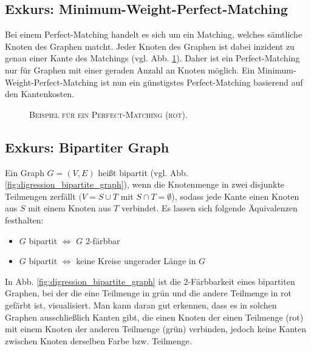 \subsection{Exkurs: Minimum-Weight-Perfect-Matching}
\label{sec:digression_mwpm}

Bei einem Perfect-Matching handelt es sich um ein Matching, welches sämtliche Knoten des Graphen matcht.
Jeder Knoten des Graphen ist dabei inzident zu genau einer Kante des Matchings (vgl. Abb. \ref{fig:perfect_matching}).
Daher ist ein Perfect-Matching nur für Graphen mit einer geraden Anzahl an Knoten möglich.
Ein Minimum-Weight-Perfect-Matching ist nun ein günstigstes Perfect-Matching basierend auf den Kantenkosten.
\begin{figure}[H]
\centering
{}
\caption{\textsc{Beispiel für ein Perfect-Matching (rot).}}
\label{fig:perfect_matching}
\end{figure}

\subsection{Exkurs: Bipartiter Graph}
\label{sec:digression_bipartite_graph}

Ein Graph $G = (V, E)$ heißt bipartit (vgl. Abb. \ref{fig:digression_bipartite_graph}), wenn die Knotenmenge in zwei disjunkte Teilmengen zerfällt
$(V = S \cup T$ mit $S \cap T = \emptyset$), sodass jede Kante einen Knoten aus $S$ mit einem Knoten aus $T$ verbindet. \cite{HochschuleDarmstadt}\newline
Es lassen sich folgende Äquivalenzen \cite{Leighton2010} festhalten:
\begin{itemize}
  \item $G$ bipartit $\iff$ $G$ 2-färbbar
  \item $G$ bipartit $\iff$ keine Kreise ungerader Länge in $G$
\end{itemize}
In Abb. \ref{fig:digression_bipartite_graph} ist die 2-Färbbarkeit eines bipartiten Graphen, bei der die eine Teilmenge
in grün und die andere Teilmenge in rot gefärbt ist, visualisiert. Man kann daran gut erkennen, dass es in solchen Graphen
ausschließlich Kanten gibt, die einen Knoten der einen Teilmenge (rot) mit einem Knoten der anderen Teilmenge (grün) verbinden,
jedoch keine Kanten zwischen Knoten derselben Farbe bzw. Teilmenge.

